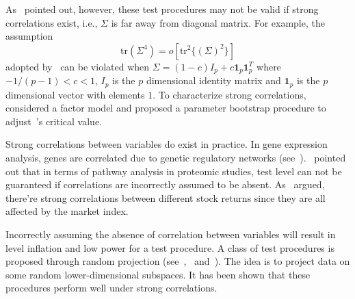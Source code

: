 As~\cite{Ma2015A} pointed out, however, these test procedures may not be valid if strong correlations exist, i.e., $\Sigma$ is far away from diagonal matrix. For example, the assumption 
\begin{equation}\label{chenscondition}
\mathrm{tr}(\Sigma^4)=o[\mathrm{tr}^2\{{(\Sigma)}^2\}]
\end{equation}
adopted by~\cite{Chen2010A} can be violated when $\Sigma=(1-c)I_p+c\bm{1}_p \bm{1}_p^T$ where $-{1}/{(p-1)}<c<1$, $I_p$ is the $p$ dimensional identity matrix and $\bm{1}_p$ is the $p$ dimensional vector  with elements $1$.
To characterize strong correlations,~\cite{Ma2015A} considered a factor model and proposed a parameter bootstrap procedure to adjust~\cite{Chen2010A}'s critical value.

Strong correlations between variables do exist in practice. In gene expression analysis, genes are correlated due to genetic regulatory networks (see~\cite{Thulin2014A}).~\cite{Chen2011A} pointed out that in terms of pathway analysis in proteomic studies,  test level can not be guaranteed if correlations are incorrectly assumed to be absent.
 As~\cite{Ma2015A} argued, there're strong correlations between different stock returns since they are all affected by the market index.

Incorrectly assuming the absence of correlation between variables will result in level inflation and low power for a test procedure. A class of test procedures is proposed through random projection (see~\cite{Lopes2015A},~\cite{Thulin2014A} and~\cite{Srivastava2014RAPTT}). The idea is to project data on some random lower-dimensional subspaces. It has been shown that these
procedures perform well under strong correlations. 

